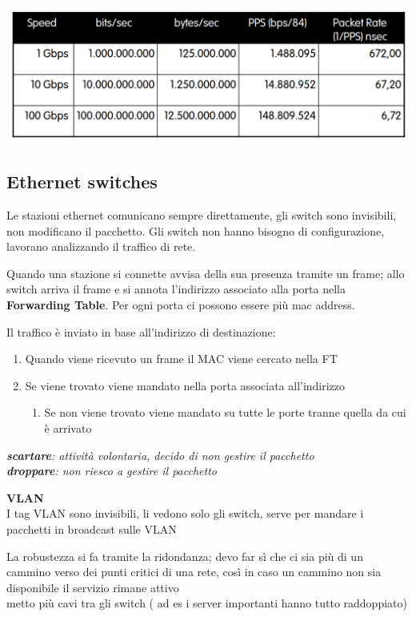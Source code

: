 \documentclass{article}
\begin{document}
\includegraphics[width=\linewidth]{5.png}

\subsection{Ethernet switches}
Le stazioni ethernet comunicano sempre direttamente, gli switch sono invisibili, non modificano il pacchetto.
Gli switch non hanno bisogno di configurazione, lavorano analizzando il traffico di rete.

Quando una stazione si connette avvisa della sua presenza tramite un frame; allo switch arriva il frame e si annota l'indirizzo associato alla porta nella \textbf{Forwarding Table}.
Per ogni porta ci possono essere più mac address.

Il traffico è inviato in base all'indirizzo di destinazione:
\begin{enumerate}
    \item Quando viene ricevuto un frame il MAC viene cercato nella FT
    \item Se viene trovato viene mandato nella porta associata all'indirizzo
    \begin{enumerate}
        \item Se non viene trovato viene mandato su tutte le porte tranne quella da cui è arrivato
    \end{enumerate}
\end{enumerate}

\par\textit{\textbf{scartare}: attività volontaria, decido di non gestire il pacchetto\\
\textbf{droppare}: non riesco a gestire il pacchetto}\\
\par \textbf{VLAN}\\
I tag VLAN sono invisibili, li vedono solo gli switch, serve per mandare i pacchetti in broadcast sulle VLAN

\par La robustezza si fa tramite la ridondanza; devo far sì che ci sia più di un cammino verso dei punti critici di una rete, così in caso un cammino non sia disponibile il servizio rimane attivo\\
metto più cavi tra gli switch ( ad es i server importanti hanno tutto raddoppiato)
\end{document}
